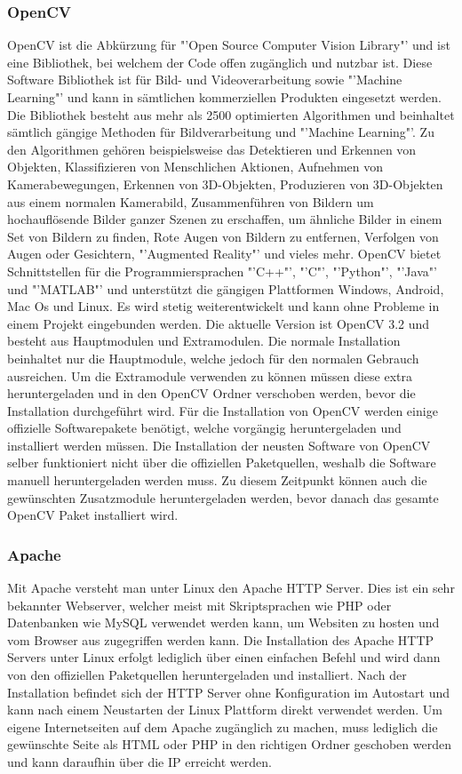 \subsubsection{OpenCV}
OpenCV ist die Abkürzung für "'Open Source Computer Vision Library"' und ist eine Bibliothek, bei welchem der Code offen zugänglich und nutzbar ist. Diese Software Bibliothek ist für Bild- und Videoverarbeitung sowie "'Machine Learning"' und kann in sämtlichen kommerziellen Produkten eingesetzt werden. Die Bibliothek besteht aus mehr als 2500 optimierten Algorithmen und beinhaltet sämtlich gängige Methoden für Bildverarbeitung und "'Machine Learning"'. Zu den Algorithmen gehören beispielsweise das Detektieren und Erkennen von Objekten, Klassifizieren von Menschlichen Aktionen, Aufnehmen von Kamerabewegungen, Erkennen von 3D-Objekten, Produzieren von 3D-Objekten aus einem normalen Kamerabild, Zusammenführen von Bildern um hochauflösende Bilder ganzer Szenen zu erschaffen, um ähnliche Bilder in einem Set von Bildern zu finden, Rote Augen von Bildern zu entfernen, Verfolgen von Augen oder Gesichtern, "'Augmented Reality"' und vieles mehr. OpenCV bietet Schnittstellen für die Programmiersprachen "'C++"', "'C"', "'Python"', "'Java"' und "'MATLAB"' und unterstützt die gängigen Plattformen Windows, Android, Mac Os und Linux. Es wird stetig weiterentwickelt und kann ohne Probleme in einem Projekt eingebunden werden. Die aktuelle Version ist OpenCV 3.2 und besteht aus Hauptmodulen und Extramodulen. Die normale Installation beinhaltet nur die Hauptmodule, welche jedoch für den normalen Gebrauch ausreichen. Um die Extramodule verwenden zu können müssen diese extra heruntergeladen und in den OpenCV Ordner verschoben werden, bevor die Installation durchgeführt wird. Für die Installation von OpenCV werden einige offizielle Softwarepakete benötigt, welche vorgängig heruntergeladen und installiert werden müssen. Die Installation der neusten Software von OpenCV selber funktioniert nicht über die offiziellen Paketquellen, weshalb die Software manuell heruntergeladen werden muss. Zu diesem Zeitpunkt können auch die gewünschten Zusatzmodule heruntergeladen werden, bevor danach das gesamte OpenCV Paket installiert wird. \cite{OpenCV}

\subsubsection{Apache}
Mit Apache versteht man unter Linux den Apache HTTP Server. Dies ist ein sehr bekannter Webserver, welcher meist mit Skriptsprachen wie PHP oder Datenbanken wie MySQL verwendet werden kann, um Websiten zu hosten und vom Browser aus zugegriffen werden kann. Die Installation des Apache HTTP Servers unter Linux erfolgt lediglich über einen einfachen Befehl und wird dann von den offiziellen Paketquellen heruntergeladen und installiert. Nach der Installation befindet sich der HTTP Server ohne Konfiguration im Autostart und kann nach einem Neustarten der Linux Plattform direkt verwendet werden. Um eigene Internetseiten auf dem Apache zugänglich zu machen, muss lediglich die gewünschte Seite als HTML oder PHP in den richtigen Ordner geschoben werden und kann daraufhin über die IP erreicht werden. \cite{Apache}